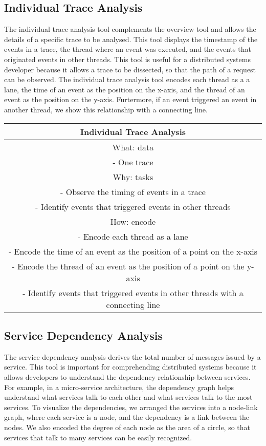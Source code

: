\subsection{Individual Trace Analysis}

The individual trace analysis tool complements the overview tool and allows the details of a specific trace to be analysed.
This tool displays the timestamp of the events in a trace,
the thread where an event was executed, and the events that originated events in other threads. This tool is useful for a distributed systems
developer because it allows a trace to be dissected, so that the path of a request can be observed. The individual trace analysis tool
encodes each thread as a a lane, the time of an event as the position on the x-axis, and the thread of an event as the position on the y-axis. Furtermore,
if an event triggered an event in another thread, we show this relationship with a connecting line.

\begin{center}
    \begin{tabular}{ |c| }
        \hline
        Individual Trace Analysis  \\
        \hline
        What: data \\
         - One trace \\
        \hline
        Why: tasks \\
         - Observe the timing of events in a trace \\
         - Identify events that triggered events in other threads \\
        \hline
        How: encode \\
         - Encode each thread as a lane \\
         - Encode the time of an event as the position of a point on the x-axis \\
         - Encode the thread of an event as the position of a point on the y-axis \\
         - Identify events that triggered events in other threads with a connecting line \\
    \end{tabular}
\end{center}


\subsection{Service Dependency Analysis}


The service dependency analysis derives the total number of messages issued by a service. 
This tool is important for comprehending distributed systems because it allows developers to understand the
dependency relationship between services. For example, in a micro-service architecture, the dependency graph helps understand what services
talk to each other and what services talk to the most services. To visualize the dependencies, we arranged the services into
a node-link graph, where each service is a node, and the dependency is a link between the nodes. We also encoded the degree of each node as the area of
a circle, so that services that talk to many services can be easily recognized.

